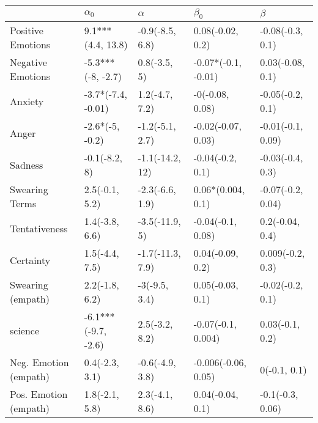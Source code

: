 \begin{tabular}{lllll}
\toprule
{} &           $\alpha_0$ &          $\alpha$ &            $\beta_0$ &            $\beta$ \\
\midrule
Positive Emotions     &    9.1***(4.4, 13.8) &   -0.9(-8.5, 6.8) &     0.08(-0.02, 0.2) &   -0.08(-0.3, 0.1) \\
Negative Emotions     &    -5.3***(-8, -2.7) &      0.8(-3.5, 5) &  -0.07*(-0.1, -0.01) &   0.03(-0.08, 0.1) \\
Anxiety               &   -3.7*(-7.4, -0.01) &    1.2(-4.7, 7.2) &      -0(-0.08, 0.08) &   -0.05(-0.2, 0.1) \\
Anger                 &      -2.6*(-5, -0.2) &   -1.2(-5.1, 2.7) &   -0.02(-0.07, 0.03) &  -0.01(-0.1, 0.09) \\
Sadness               &        -0.1(-8.2, 8) &   -1.1(-14.2, 12) &     -0.04(-0.2, 0.1) &   -0.03(-0.4, 0.3) \\
Swearing Terms        &       2.5(-0.1, 5.2) &   -2.3(-6.6, 1.9) &    0.06*(0.004, 0.1) &  -0.07(-0.2, 0.04) \\
Tentativeness         &       1.4(-3.8, 6.6) &    -3.5(-11.9, 5) &    -0.04(-0.1, 0.08) &    0.2(-0.04, 0.4) \\
Certainty             &       1.5(-4.4, 7.5) &  -1.7(-11.3, 7.9) &     0.04(-0.09, 0.2) &   0.009(-0.2, 0.3) \\
Swearing (empath)     &       2.2(-1.8, 6.2) &     -3(-9.5, 3.4) &     0.05(-0.03, 0.1) &   -0.02(-0.2, 0.1) \\
science               &  -6.1***(-9.7, -2.6) &    2.5(-3.2, 8.2) &   -0.07(-0.1, 0.004) &    0.03(-0.1, 0.2) \\
Neg. Emotion (empath) &       0.4(-2.3, 3.1) &   -0.6(-4.9, 3.8) &  -0.006(-0.06, 0.05) &       0(-0.1, 0.1) \\
Pos. Emotion (empath) &       1.8(-2.1, 5.8) &    2.3(-4.1, 8.6) &     0.04(-0.04, 0.1) &   -0.1(-0.3, 0.06) \\
\bottomrule
\end{tabular}
